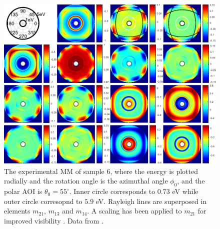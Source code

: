 \begin{figure}[h]
    \centering
    \includegraphics[width=\linewidth]{figures/ch4/S6/exp/Muller_rot_S6_55.pdf}
    \caption{The experimental MM of sample 6, where the energy is plotted radially and the rotation angle is the azimuthal angle $\phi_0$, and the polar AOI is $\theta_0=55^\circ$. Inner circle corresponds to $0.73$ eV while outer circle corresopnd to $5.9$ eV. Rayleigh lines are superposed in elements $m_{21}$, $m_{13}$ and $m_{14}$. A scaling has been applied to $m_{21}$ for improved visibility . Data from \cite{brakstad_thesis}.}
    \label{fig:S6_contour_MM_exp}
\end{figure}

